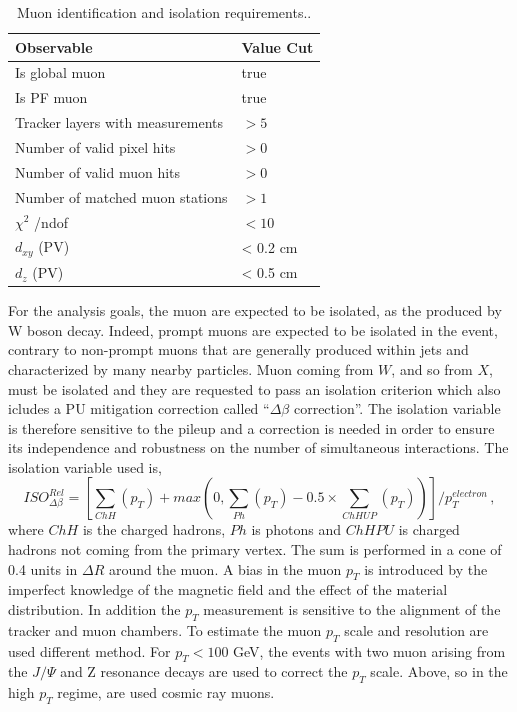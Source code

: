 \begin{table}
\centering
\begin{tabular}{|ll|}
\hline
Observable& Value Cut\\
\hline
Is global muon                        & true              \\ 
Is PF muon                            & true              \\ 
Tracker layers with measurements      & $>5$              \\ 
Number of valid pixel hits            & $>0$              \\ 
Number of valid muon hits             & $>0$              \\ 
Number of matched muon stations       & $>1$              \\ 
$\chi^2$ /ndof                        & $<10$             \\ 
$d_{xy}$ (PV)                         & < 0.2 cm          \\ 
$d_z$ (PV)                            & < 0.5 cm          \\ 
\hline
\end{tabular}
\caption{Muon identification and isolation requirements..}
\label{IDm}
\end{table}
For the analysis goals, the muon are expected to be isolated, as the  produced by W boson decay. Indeed, prompt muons are expected to be isolated in the event, contrary to non-prompt muons that are generally produced within jets and characterized by many
nearby particles. Muon coming from $W$, and so from $X$, must be isolated and they are requested to pass an isolation
criterion which also icludes a PU mitigation correction called ``$\Delta \beta$ correction''.
The isolation variable is therefore sensitive to the
pileup and a correction is needed in order to ensure its independence and robustness on
the number of simultaneous interactions. The isolation variable used is,
\begin{equation} 
ISO^{Rel}_{\Delta \beta}=[\sum_{ChH}(p_T) + max(0, \sum_{Ph}(p_T) -0.5 \times \sum_{ChHUP}(p_T)) ]/p_T^{electron} \, ,
\end{equation}
where $ChH$ is the charged hadrons, $Ph$ is photons and $ChHPU$ is charged
hadrons not coming from the primary vertex.  The sum is performed in a cone of 0.4 units in $\Delta R$ around the muon.
A bias in the muon $p_T$ is introduced by the imperfect knowledge
of the magnetic field and the effect of the material distribution. In addition the $p_T$ measurement is sensitive to the alignment of the tracker and
muon chambers. To estimate the muon $p_T$ scale and resolution are used different method. For $p_T<100$ GeV, the  events with two muon arising from the $J/\Psi$ and Z
resonance decays are used to correct the $p_T$ scale. Above, so in the high $p_T$ regime, are used cosmic ray muons.

